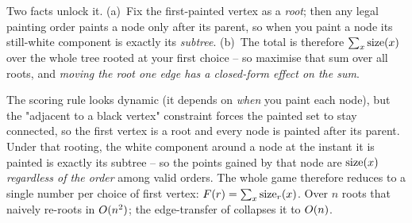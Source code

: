 \begin{attemptgate}
Two facts unlock it. (a)~Fix the first-painted vertex as a \emph{root}; then any
legal painting order paints a node only after its parent, so when you paint a
node its still-white component is exactly its \emph{subtree}. (b)~The total is
therefore $\sum_x \operatorname{size}(x)$ over the whole tree rooted at your first choice --
so maximise that sum over all roots, and \emph{moving the root one edge has a
closed-form effect on the sum}.
\end{attemptgate}

The scoring rule looks dynamic (it depends on \emph{when} you paint each node),
but the "adjacent to a black vertex" constraint forces the painted set to stay
connected, so the first vertex is a root and every node is painted after its
parent. Under that rooting, the white component around a node at the instant it
is painted is exactly its subtree -- so the points gained by that node are
$\operatorname{size}(x)$ \emph{regardless of the order} among valid orders. The whole game
therefore reduces to a single number per choice of first vertex:
$F(r)=\sum_x \operatorname{size}_{r}(x)$. Over $n$ roots that naively re-roots in
$O(n^2)$; the edge-transfer of  collapses it to
$O(n)$.

